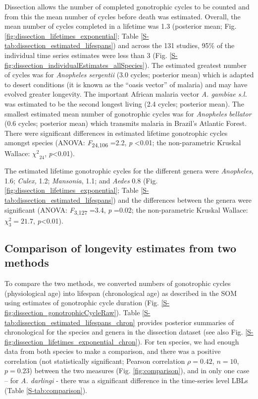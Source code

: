 \documentclass[]{article}
\begin{document}
Dissection allows the number of completed gonotrophic cycles to be
counted and from this the mean number of cycles before death was
estimated. Overall, the mean number of cycles completed in a lifetime
was 1.3 (posterior mean; Fig. \ref{fig:dissection_lifetimes_exponential}; Table \ref{S-tab:dissection_estimated_lifespans}) and across the 131 studies, 95\% of
the individual time series estimates were less than 3 (Fig. \ref{S-fig:dissection_individualEstimates_allSpecies}). The
estimated greatest number of cycles was for \emph{Anopheles sergentii}
(3.0 cycles; posterior mean) which is adapted to desert conditions (it
is known as the ``oasis vector'' of malaria) and may have evolved
greater longevity. The important African malaria vector \emph{A.
gambiae s.l.} was estimated to be the second longest living (2.4 cycles;
posterior mean). The smallest estimated mean number of gonotrophic
cycles was for \emph{Anopheles} \emph{bellator} (0.6 cycles; posterior
mean) which transmits malaria in Brazil's Atlantic Forest. There were
significant differences in estimated lifetime gonotrophic cycles amongst
species (ANOVA: \emph{F}\textsubscript{24,106} =2.2, \emph{p}
\textless{}0.01; the non-parametric Kruskal Wallace:
\({\chi^{2}}_{24}\), \emph{p}\textless{}0.01).

The estimated lifetime gonotrophic cycles for the different genera were
\emph{Anopheles,} 1.6; \emph{Culex,} 1.2; \emph{Mansonia}, 1.1; and
\emph{Aedes} 0.8 (Fig. \ref{fig:dissection_lifetimes_exponential}; Table \ref{S-tab:dissection_estimated_lifespans}) and the differences between the genera were
significant (ANOVA: \emph{F}\textsubscript{3,127} =3.4, \emph{p} =0.02;
the non-parametric Kruskal Wallace: \(\chi_{3}^{2} = 21.7\),
\emph{p}\textless{}0.01).

\subsection{Comparison of longevity estimates from two
methods}\label{comparison-of-longevity-estimates-from-two-methods}

To compare the two methods, we converted numbers of gonotrophic cycles
(physiological age) into lifespan (chronological age) as described in
the SOM using estimates of gonotrophic cycle duration (Fig. \ref{S-fig:dissection_gonotrophicCycleRaw}). Table \ref{S-tab:dissection_estimated_lifespans_chron} provides posterior summaries of chronological for the species and genera in the dissection dataset (see also Fig. \ref{S-fig:dissection_lifetimes_exponential_chron}). For ten species, we had enough data from both species to make a comparison, and there was a positive correlation (not
statistically significant; Pearson correlation $\rho=0.42$, $n=10$, $p=0.23$)
between the two measures (Fig. \ref{fig:comparison}), and in only one case -- for \emph{A.
darlingi} - there was a significant difference in the
time-series level LBLs (Table \ref{S-tab:comparison}).
\end{document}
